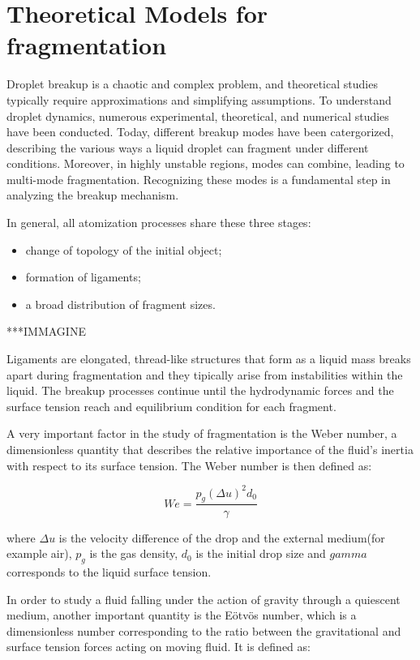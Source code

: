 \chapter{Theoretical Models for fragmentation}

Droplet breakup is a chaotic and complex problem, and theoretical studies typically require approximations and simplifying assumptions. To understand droplet dynamics, numerous experimental, theoretical, and numerical studies have been conducted. Today, different breakup modes have been catergorized, describing the various ways a liquid droplet can fragment under different conditions. Moreover, in highly unstable regions, modes can combine, leading to multi-mode fragmentation. Recognizing these modes is a fundamental step in analyzing the breakup mechanism. \cite{Mazi_article}

In general, all atomization processes share these three stages:
\begin{itemize}
    \item change of topology of the initial object;
    \item formation of ligaments;
    \item a broad distribution of fragment sizes.
\end{itemize}

***IMMAGINE
 
 Ligaments are elongated, thread-like structures that form as a liquid mass breaks apart during fragmentation and they tipically arise from instabilities within the liquid. The breakup processes continue until the hydrodynamic forces and the surface tension reach and equilibrium condition for each fragment. \cite{Mazi_article} 

A very important factor in the study of fragmentation is the Weber number, a dimensionless quantity that describes the relative importance of the fluid's inertia with respect to its surface tension. The Weber number is then defined as:

\begin{equation}
    We = \frac{p_g (\Delta u)^2 d_0}{\gamma}
    \label{eq:weber_number}
\end{equation}

where $\Delta u$ is the velocity difference of the drop and the external medium(for example air), $p_g$ is the gas density, $d_0$ is the initial drop size and $gamma$ corresponds to the liquid surface tension. 

In order to study a fluid falling under the action of gravity through a quiescent medium, another important quantity is the Eötvös number, which is a dimensionless number corresponding to the ratio between the gravitational and surface tension forces acting on moving fluid. It is defined as: 

